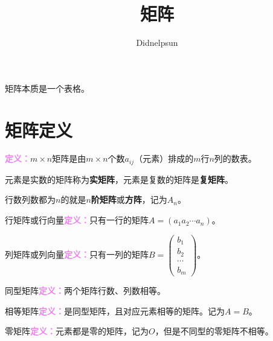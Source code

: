 \documentclass[UTF8, 12pt]{ctexart}
\author{Didnelpsun}
\title{矩阵}
\date{}
\begin{document}
\maketitle
\pagestyle{empty}
\thispagestyle{empty}
\tableofcontents
\thispagestyle{empty}
\newpage
\pagestyle{plain}
\setcounter{page}{1}

矩阵本质是一个表格。

\section{矩阵定义}

\textcolor{violet}{\textbf{定义：}}$m\times n$矩阵是由$m\times n$个数$a_{ij}$（元素）排成的$m$行$n$列的数表。

元素是实数的矩阵称为\textbf{实矩阵}，元素是复数的矩阵是\textbf{复矩阵}。

行数列数都为$n$的就是\textbf{$n$阶矩阵}或\textbf{方阵}，记为$A_n$。

行矩阵或行向量\textcolor{violet}{\textbf{定义：}}只有一行的矩阵$A=(a_1a_2\cdots a_n)$。

列矩阵或列向量\textcolor{violet}{\textbf{定义：}}只有一列的矩阵$B=
\left(\begin{array}{c} 
    b_1 \\
    b_2 \\
    \cdots \\
    b_m
\end{array}\right)$。

同型矩阵\textcolor{violet}{\textbf{定义：}}两个矩阵行数、列数相等。

相等矩阵\textcolor{violet}{\textbf{定义：}}是同型矩阵，且对应元素相等的矩阵。记为$A=B$。

零矩阵\textcolor{violet}{\textbf{定义：}}元素都是零的矩阵，记为$O$，但是不同型的零矩阵不相等。
\end{document}
